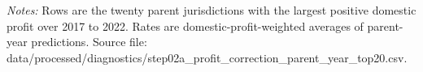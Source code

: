 \begin{table}[H]
\vspace{0.5em}
\begin{minipage}{0.96\textwidth}
\footnotesize\raggedright \textit{Notes:} Rows are the twenty parent jurisdictions with the largest positive domestic profit over 2017 to 2022. Rates are domestic-profit-weighted averages of parent-year predictions. Source file: data/processed/diagnostics/step02a\_profit\_correction\_parent\_year\_top20.csv.
\end{minipage}
\end{table}

